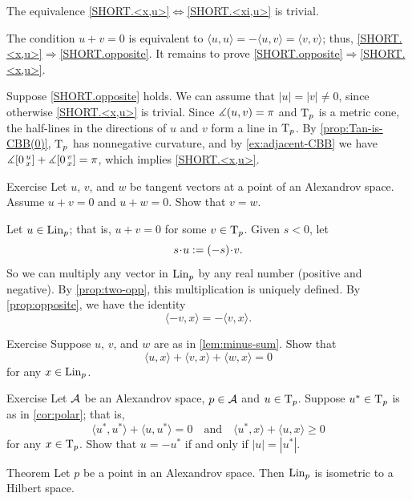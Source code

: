 The equivalence \ref{SHORT.<x,u>}$\Leftrightarrow$\ref{SHORT.<xi,u>} is trivial.

The condition $u+v=0$ is equivalent to 
$\langle u,u\rangle =-\langle u,v\rangle =\langle v,v\rangle$;
thus,
\ref{SHORT.<x,u>}$\Rightarrow$\ref{SHORT.opposite}.
It remains to prove \ref{SHORT.opposite}$\Rightarrow$\ref{SHORT.<x,u>}.

Suppose \ref{SHORT.opposite} holds.
We can assume that $|u|=|v|\ne 0$, since otherwise \ref{SHORT.<x,u>} is trivial.
Since $\measuredangle(u,v)=\pi$ and $\mathrm{T}_p$ is a metric cone, the half-lines in the directions of $u$ and $v$ form a line in $\mathrm{T}_p$.
By \ref{prop:Tan-is-CBB(0)}, $\mathrm{T}_p$ has nonnegative curvature, and by \ref{ex:adjacent-CBB} we have $\measuredangle[0\,{}^{u}_{x}]+\measuredangle[0\,{}^{v}_{x}]=\pi$, which implies \ref{SHORT.<x,u>}.
\qeds

\begin{thm}[!]{Exercise}\label{prop:two-opp}
Let $u$, $v$, and $w$ be tangent vectors at a point of an Alexandrov space.
Assume $u+v=0$ and $u+w=0$.
Show that $v=w$.
\end{thm}

Let $u\in \mathop{\rm Lin}\nolimits_p$; that is, $u+v=0$ for some $v\in\mathrm{T}_p$.
Given $s<0$, let 
\[s\cdot u\df (-s)\cdot v.\]
So we can multiply any vector in $\mathop{\rm Lin}\nolimits_p$ by any real number (positive and negative).
By \ref{prop:two-opp}, this multiplication is uniquely defined.
By \ref{prop:opposite}, we have the identity
\[\langle -v,x\rangle=-\langle v,x\rangle.\]


\begin{thm}[!]{Exercise}\label{ex:3<,>=0}
Suppose $u$, $v$, and $w$ are as in \ref{lem:minus-sum}.
Show that
\[\langle u,x\rangle +\langle v,x\rangle +\langle w,x\rangle = 0\]
for any $x\in \mathop{\rm Lin}\nolimits_p$.
\end{thm}

\begin{thm}[!]{Exercise}\label{ex:-u}
Let $\mathcal{A}$ be an Alexandrov space,
$p\in \mathcal{A}$ and $u\in \mathrm{T}_p$.
Suppose $u^*\in \mathrm{T}_p$ is as in \ref{cor:polar};
that is, 
\[\langle u^*,u^*\rangle +\langle u,u^*\rangle = 0
\quad\text{and}\quad
\langle u^*,x\rangle +\langle u,x\rangle \ge 0
\]
for any $x\in \mathrm{T}_p$.
Show that $u=-u^*$ if and only if $|u|=|u^*|$.
\end{thm}

\begin{thm}{Theorem}\label{thm:lin-subcone}
Let $p$ be a point in an Alexandrov space. 
Then $\mathop{\rm Lin}\nolimits_p$ is isometric to a Hilbert space.
\end{thm}

